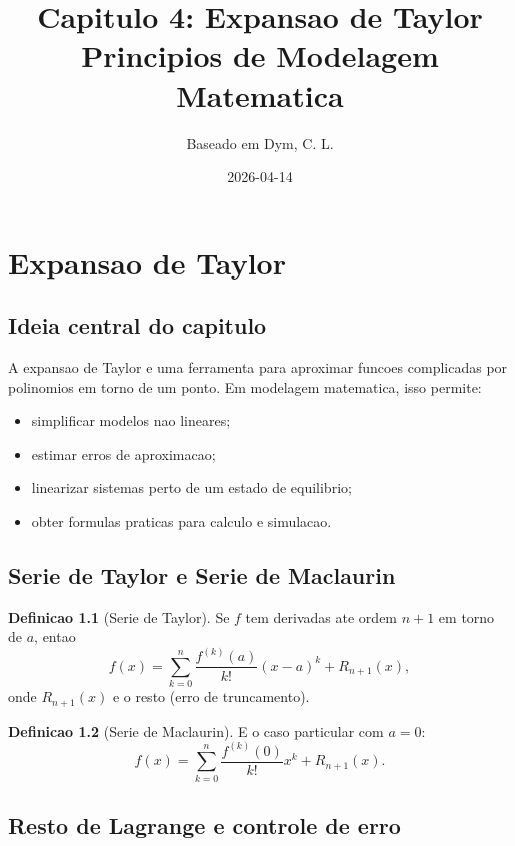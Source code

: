 \documentclass[12pt,a4paper,oneside]{book}
\title{\textbf{Capitulo 4: Expansao de Taylor}\\[0.4cm]
\large Principios de Modelagem Matematica}
\author{Baseado em Dym, C. L.}
\date{2026-04-14}
\theoremstyle{definition}
\newtheorem{definition}{Definicao}[chapter]
\begin{document}
\maketitle
\tableofcontents
\newpage

\chapter{Expansao de Taylor}

\section{Ideia central do capitulo}

A expansao de Taylor e uma ferramenta para aproximar funcoes complicadas por polinomios em torno de um ponto.
Em modelagem matematica, isso permite:

\begin{itemize}
    \item simplificar modelos nao lineares;
    \item estimar erros de aproximacao;
    \item linearizar sistemas perto de um estado de equilibrio;
    \item obter formulas praticas para calculo e simulacao.
\end{itemize}

\section{Serie de Taylor e Serie de Maclaurin}

\begin{definition}[Serie de Taylor]
Se $f$ tem derivadas ate ordem $n+1$ em torno de $a$, entao
\begin{equation}
f(x)=\sum_{k=0}^{n}\frac{f^{(k)}(a)}{k!}(x-a)^k + R_{n+1}(x),
\end{equation}
onde $R_{n+1}(x)$ e o resto (erro de truncamento).
\end{definition}

\begin{definition}[Serie de Maclaurin]
E o caso particular com $a=0$:
\begin{equation}
f(x)=\sum_{k=0}^{n}\frac{f^{(k)}(0)}{k!}x^k + R_{n+1}(x).
\end{equation}
\end{definition}

\section{Resto de Lagrange e controle de erro}
\end{document}
